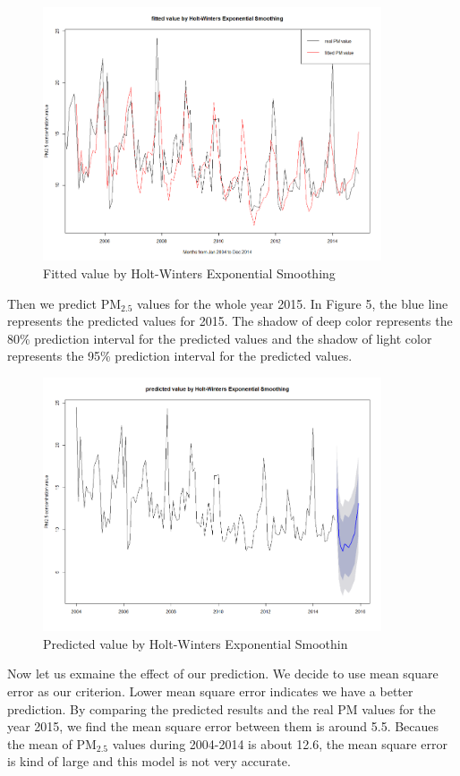 \documentclass[10pt]{article}
\begin{document}
\begin{figure}[H]
\centering
\includegraphics[width = 100mm]{ts2.png}
\caption{Fitted value by Holt-Winters Exponential Smoothing}
\end{figure}

Then we predict PM$_{2.5}$ values for the whole year 2015. In Figure 5, the blue line represents the predicted values for 2015. The shadow of deep color represents the 80\% prediction interval for the predicted values and the shadow of light color represents the 95\% prediction interval for the predicted values.

\begin{figure}[H]
\centering
\includegraphics[width = 100mm]{ts3.png}
\caption{Predicted value by Holt-Winters Exponential Smoothin}
\end{figure}

Now let us exmaine the effect of our prediction. We decide to use mean square error as our criterion. Lower mean square error indicates we have a better prediction. By comparing the predicted results and the real PM values for the year 2015, we find the mean square error between them is around 5.5. Becaues the mean of PM$_{2.5}$ values during 2004-2014 is about 12.6, the mean square error is kind of large and this model is not very accurate.
\end{document}
